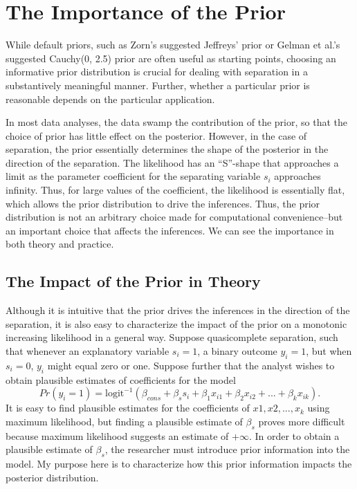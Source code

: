 \documentclass[12pt]{article}
\begin{document}
\section*{The Importance of the Prior}

While default priors, such as Zorn's suggested Jeffreys' prior or Gelman et al.'s suggested Cauchy(0, 2.5) prior are often useful as starting points, choosing an informative prior distribution is crucial for dealing with separation in a substantively meaningful manner. Further, whether a particular prior is reasonable depends on the particular application.

In most data analyses, the data swamp the contribution of the prior, so that the choice of prior has little effect on the posterior. However, in the case of separation, the prior essentially determines the shape of the posterior in the direction of the separation. The likelihood has an ``S''-shape that approaches a limit as the parameter coefficient for the separating variable $s_i$ approaches infinity. Thus, for large values of the coefficient, the likelihood is essentially flat, which allows the prior distribution to drive the inferences. Thus, the prior distribution is not an arbitrary choice made for computational convenience--but an important choice that affects the inferences. We can see the importance in both theory and practice.

\subsection*{The Impact of the Prior in Theory}

Although it is intuitive that the prior drives the inferences in the direction of the separation, it is also easy to characterize the impact of the prior on a monotonic increasing likelihood in a general way. Suppose quasicomplete separation, such that whenever an explanatory variable $s_i = 1$, a binary outcome $y_i = 1$, but when $s_i = 0$, $y_i$ might equal zero or one. Suppose further that the analyst wishes to obtain plausible estimates of coefficients for the model
\begin{equation*}
Pr(y_i =1) = \text{logit}^{-1}(\beta_{cons} + \beta_s s_i +  \beta_1 x_{i1} + \beta_2 x_{i2} + ... + \beta_k x_{ik}). 
\end{equation*}
\noindent It is easy to find plausible estimates for the coefficients of $x1, x2, ..., x_k$ using maximum likelihood, but finding a plausible estimate of $\beta_{s}$ proves more difficult because maximum likelihood suggests an estimate of $+\infty$. In order to obtain a plausible estimate of $\beta_{s}$, the researcher must introduce prior information into the model. My purpose here is to characterize how this prior information impacts the posterior distribution.
\end{document}
